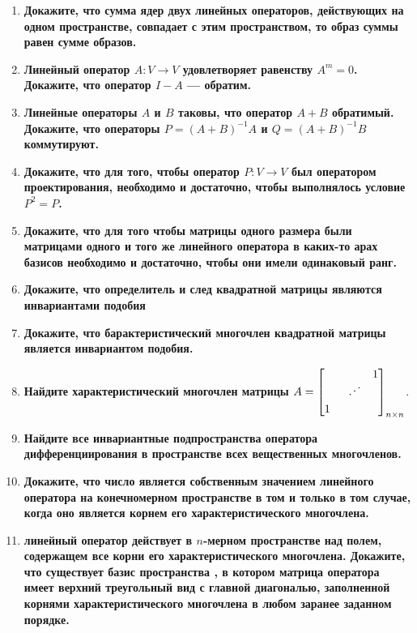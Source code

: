 \documentclass[12pt]{article} %
\begin{document}
\begin{enumerate}
    \item \textbf{Докажите, что сумма ядер двух линейных операторов, действующих на одном пространстве, совпадает с этим пространством, то образ суммы равен сумме образов.}
    \item \textbf{Линейный оператор $A: V \rightarrow V$ удовлетворяет равенству $A^m = 0$. Докажите, что оператор $I - A$ --- обратим.}
    \item \textbf{Линейные операторы $A$ и $B$ таковы, что оператор $A + B$ обратимый. Докажите, что операторы $P = (A + B)^{-1}A$ и $Q = (A + B)^{-1}B$ коммутируют.}
    \item \textbf{Докажите, что для того, чтобы оператор $P: V \rightarrow V$ был оператором проектирования, необходимо и достаточно, чтобы выполнялось условие $P^2 = P$.}
    \item \textbf{Докажите, что для того чтобы матрицы одного размера были матрицами одного и того же линейного оператора в каких-то арах базисов необходимо и достаточно, чтобы они имели одинаковый ранг.}
    \item \textbf{Докажите, что определитель и след квадратной матрицы являются инвариантами подобия}
    \item \textbf{Докажите, что барактеристический многочлен квадратной матрицы является инвариантом подобия.}
    \item \textbf{Найдите характеристический многочлен матрицы $A = 
    \begin{bmatrix}
         &&1\\
         &\rotatebox[origin=c]{75}{$\ddots$}&\\
         1&& \\
    \end{bmatrix}_{n \times n}
    $}.
    \item \textbf{Найдите все инвариантные подпространства оператора дифференциирования в пространстве всех вещественных многочленов.}
    \item \textbf{Докажите, что число является собственным значением линейного оператора на конечномерном пространстве в том и только в том случае, когда оно является корнем его характеристического многочлена.}
    \item \textbf{линейный оператор действует в $n$-мерном пространстве над полем, содержащем все корни его характеристического многочлена. Докажите, что существует базис пространства , в котором матрица оператора имеет верхний треугольный вид с главной диагональю, заполненной корнями характеристического многочлена в любом заранее заданном порядке.}

\end{enumerate}
\end{document}
